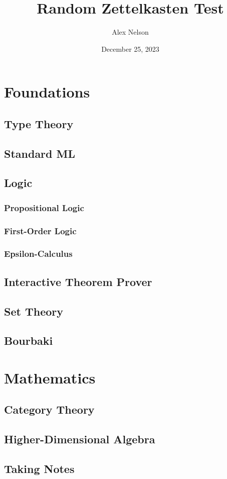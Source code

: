 \documentclass[dvipsnames,HTML]{amsbook}
\title{Random Zettelkasten Test}
\author{Alex Nelson}
\date{December 25, 2023}
\begin{document}
\frontmatter
\maketitle
\tableofcontents
\listofpuzzles

\mainmatter
\vfill\eject

\part{Foundations}
\chapter{Type Theory}


\chapter{Standard ML}


\chapter{Logic}
\section{Propositional Logic}

\section{First-Order Logic}

\section{Epsilon-Calculus}


\chapter{Interactive Theorem Prover}


\chapter{Set Theory}

% 

\chapter{Bourbaki}


\part{Mathematics}

\chapter{Category Theory}

\chapter{Higher-Dimensional Algebra}


\backmatter
\appendix
\chapter{Taking Notes}


\unappendix
\nocite{*}

\end{document}
